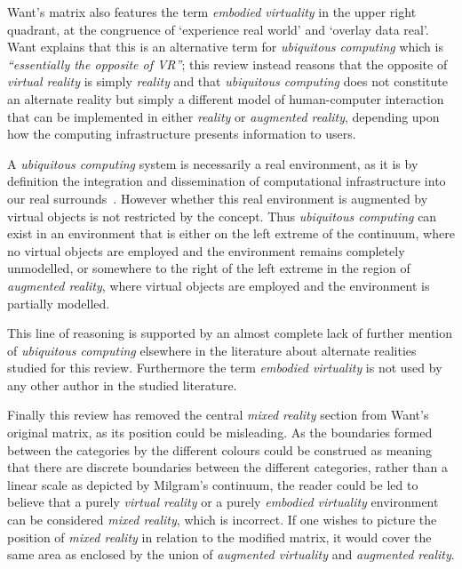 Want's matrix also features the term \textit{embodied virtuality} in the upper right quadrant, at the congruence of `experience real world' and `overlay data real'. Want explains that this is an alternative term for \textit{ubiquitous computing} which is \textit{``essentially the opposite of VR''}; this review instead reasons that the opposite of \textit{virtual reality} is simply \textit{reality} and that \textit{ubiquitous computing} does not constitute an alternate reality but simply a different model of human-computer interaction that can be implemented in either \textit{reality} or \textit{augmented reality}, depending upon how the computing infrastructure presents information to users.

A \textit{ubiquitous computing} system is necessarily a real environment, as it is by definition the integration and dissemination of computational infrastructure into our real surrounds~\cite{York2004}. However whether this real environment is augmented by virtual objects is not restricted by the concept. Thus \textit{ubiquitous computing} can exist in an environment that is either on the left extreme of the continuum, where no virtual objects are employed and the environment remains completely unmodelled, or somewhere to the right of the left extreme in the region of \textit{augmented reality}, where virtual objects are employed and the environment is partially modelled.

This line of reasoning is supported by an almost complete lack of further mention of \textit{ubiquitous computing} elsewhere in the literature about alternate realities studied for this review. Furthermore the term \textit{embodied virtuality} is not used by any other author in the studied literature.

Finally this review has removed the central \textit{mixed reality} section from Want's original matrix, as its position could be misleading. As the boundaries formed between the categories by the different colours could be construed as meaning that there are discrete boundaries between the different categories, rather than a linear scale as depicted by Milgram's continuum, the reader could be led to believe that a purely \textit{virtual reality} or a purely \textit{embodied virtuality} environment can be considered \textit{mixed reality}, which is incorrect. If one wishes to picture the position of \textit{mixed reality} in relation to the modified matrix, it would cover the same area as enclosed by the union of \textit{augmented virtuality} and \textit{augmented reality}.

